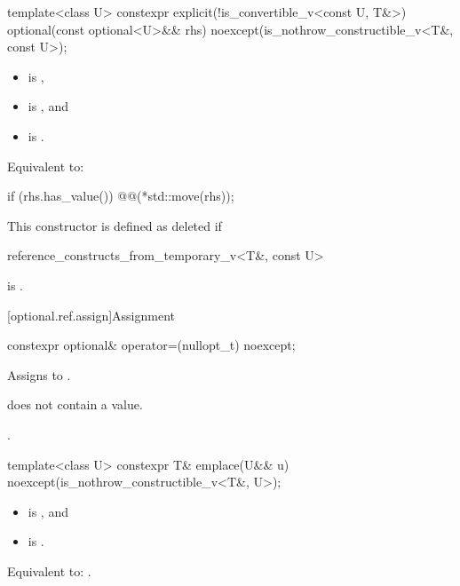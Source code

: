 \begin{itemdecl}
template<class U>
  constexpr explicit(!is_convertible_v<const U, T&>)
  optional(const optional<U>&& rhs) noexcept(is_nothrow_constructible_v<T&, const U>);
\end{itemdecl}

\begin{itemdescr}
\pnum
\constraints
\begin{itemize}
\item {} is ,
\item {} is , and
\item {} is .
\end{itemize}

\pnum
\effects
Equivalent to:
\begin{codeblock}
if (rhs.has_value()) @@(*std::move(rhs));
\end{codeblock}

\pnum
\remarks
This constructor is defined as deleted if
\begin{codeblock}
reference_constructs_from_temporary_v<T&, const U>
\end{codeblock}
is .
\end{itemdescr}

[optional.ref.assign]{Assignment}

\begin{itemdecl}
constexpr optional& operator=(nullopt_t) noexcept;
\end{itemdecl}

\begin{itemdescr}
\pnum
\effects
Assigns  to .

\pnum
\ensures
{} does not contain a value.

\pnum
\returns
{}.
\end{itemdescr}

\begin{itemdecl}
template<class U>
  constexpr T& emplace(U&& u) noexcept(is_nothrow_constructible_v<T&, U>);
\end{itemdecl}

\begin{itemdescr}
\pnum
\constraints
\begin{itemize}
\item {} is , and
\item {} is .
\end{itemize}

\pnum
\effects
Equivalent to: .
\end{itemdescr}

